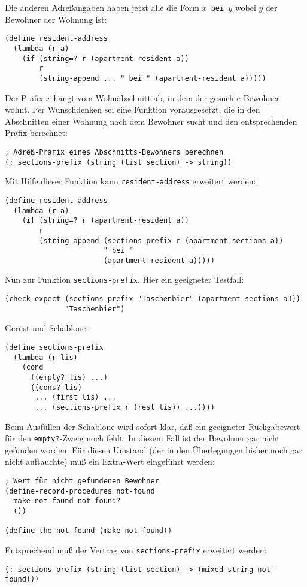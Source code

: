 Die anderen Adreßangaben haben jetzt alle die Form \texttt{$x$ bei
$y$} wobei $y$ der Bewohner der Wohnung ist:
%
\begin{verbatim}
(define resident-address
  (lambda (r a)
    (if (string=? r (apartment-resident a))
        r
        (string-append ... " bei " (apartment-resident a)))))
\end{verbatim}
%
Der Präfix $x$ hängt vom Wohnabschnitt ab, in dem der gesuchte
Bewohner wohnt.  Per Wunschdenken sei eine Funktion vorausgesetzt, die
in den Abschnitten einer Wohnung nach dem Bewohner sucht und den
entsprechenden Präfix berechnet:
%
\begin{verbatim}
; Adreß-Präfix eines Abschnitts-Bewohners berechnen
(: sections-prefix (string (list section) -> string))
\end{verbatim}
%
Mit Hilfe dieser Funktion kann \texttt{resident-address} erweitert
werden:
%
\begin{verbatim}
(define resident-address
  (lambda (r a)
    (if (string=? r (apartment-resident a))
        r
        (string-append (sections-prefix r (apartment-sections a))
                       " bei "
                       (apartment-resident a)))))
\end{verbatim}
%
Nun zur Funktion \texttt{sections-prefix}.  Hier ein geeigneter
Testfall:
%
\begin{verbatim}
(check-expect (sections-prefix "Taschenbier" (apartment-sections a3))
              "Taschenbier")
\end{verbatim}
%
Gerüst und Schablone:
%
\begin{verbatim}
(define sections-prefix
  (lambda (r lis)
    (cond
      ((empty? lis) ...)
      ((cons? lis)
       ... (first lis) ...
       ... (sections-prefix r (rest lis)) ...))))
\end{verbatim}
%
Beim Ausfüllen der Schablone wird sofort klar, daß ein geeigneter
Rückgabewert für den \texttt{empty?}-Zweig noch fehlt: In diesem Fall
ist der Bewohner gar nicht gefunden worden.  Für diesen Umstand (der
in den Überlegungen bisher noch gar nicht auftauchte) muß
ein Extra-Wert eingeführt werden:
%
\begin{verbatim}
; Wert für nicht gefundenen Bewohner
(define-record-procedures not-found
  make-not-found not-found?
  ())

(define the-not-found (make-not-found))
\end{verbatim}
%
Entsprechend muß der Vertrag von \texttt{sections-prefix} erweitert
werden:
%
\begin{verbatim}
(: sections-prefix (string (list section) -> (mixed string not-found)))
\end{verbatim}
